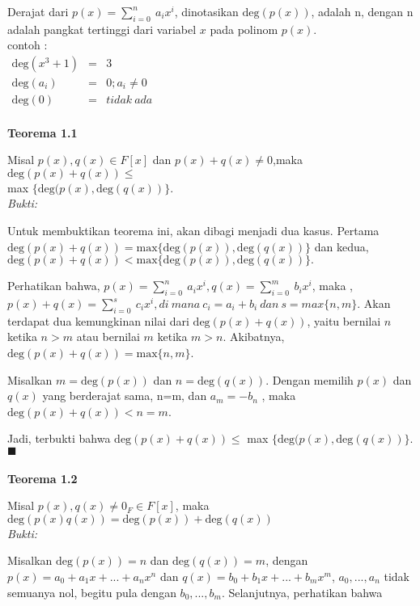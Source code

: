 \par	Derajat dari $p(x)= \sum^{n}_{i=0} \ a_ix^i $, dinotasikan $\mathrm{deg}(p(x))$, adalah n, dengan n adalah 		pangkat tertinggi dari variabel $x$ pada polinom $p(x)$.
	\\ contoh : 
	\\ $\begin{array}{lcl}
	\mathrm{deg}( x^3 +1) &=& 3
	\\\mathrm{deg} ( a_i) &=& 0 ; a_i \ne 0
	\\\mathrm{deg} ( 0) &=& tidak~ada
	\end{array}$
	\\ \\
	\textbf{ Teorema 1.1}
\par 	Misal $ p(x), q(x) \in F[x]$ dan $ p(x) + q(x) \ne 0$,maka   $\mathrm{deg}(p(x) + q(x)) \le $ 
	\\max $\{\mathrm{deg}(p(x),\mathrm{deg}(q(x))\}$.
	\\
	\textit{Bukti:}
\par 	Untuk membuktikan teorema ini, akan dibagi menjadi dua kasus. Pertama  $\mathrm{deg}(p(x) + q(x)) = \mathrm{max} 
\{\mathrm{deg}(p(x)),\mathrm{deg}(q(x))\}$ dan kedua, $\mathrm{deg}(p(x) + q(x)) <  \mathrm{max} \{\mathrm{deg}(p(x)),\mathrm{deg}(q(x))\}.$
\par	 Perhatikan bahwa, $p(x) = \sum^{n}_{i=0} \ a_ix^i    ,   q(x) = \sum^{m}_{i=0} \ b_ix^i$, maka , $p(x) + q(x) = \sum^{s}_{i=0} \ c_ix^i , di~mana~ c_i = a_i + b_i ~dan~ s =max\{n,m\}$. Akan terdapat dua kemungkinan nilai dari $\mathrm{deg}(p(x) + q(x))$, yaitu bernilai 		$n$ ketika $n>m$ atau bernilai $m$ ketika $m>n$. Akibatnya, $\mathrm{deg}(p(x) + q(x))=\mathrm{max}\{n,m\}$. 
\par 	Misalkan $m=\mathrm{deg}(p(x))$ dan $n=\mathrm{deg}(q(x))$. Dengan memilih $p(x)$ dan $q(x)$ yang berderajat sama, n=m, dan $a_m = -b_n$ , maka $\mathrm{deg}(p(x) + q(x)) < n = m$.
\par 	Jadi, terbukti bahwa  $\mathrm{deg}(p(x) + q(x)) \le $ max $\{\mathrm{deg}(p(x),\mathrm{deg}(q(x))\}$. $\blacksquare$
	\\ 
	\\ \textbf {Teorema 1.2}
\par Misal $p(x),q(x) \ne 0_F \in F[x]$,  maka $\mathrm{\mathrm{deg}}(p(x)q(x))= \mathrm{\mathrm{deg}}(p(x)) + \mathrm{\mathrm{deg}}(q(x))$
\\ 
	\textit{Bukti:}
\par Misalkan $\mathrm{\mathrm{deg}}(p(x))=n$ dan $\mathrm{\mathrm{deg}}(q(x))=m$, dengan $p(x)=a_0+a_1x+...+a_nx^n$ dan $q(x)=b_0+b_1x+...+b_mx^m$, $a_0,...,a_n$ tidak semuanya nol, begitu pula dengan $b_0,...,b_m$. Selanjutnya, perhatikan bahwa 
